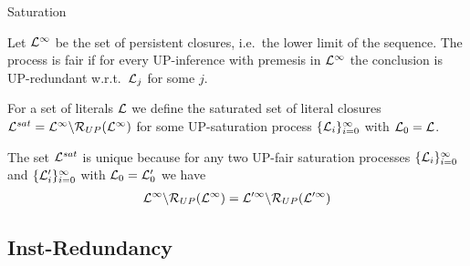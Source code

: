 \documentclass[%
]{beamer}
\begin{document}
\begin{frame}[allowframebreaks]{Saturation}
    \begin{definition}
        Let \( \mathcal{L}^\infty \) be the set of persistent closures,
        i.e.~the lower limit of the sequence.
        The process is { fair} if for every UP-inference
        with premesis in \( \mathcal{L}^\infty \) the conclusion is UP-redundant
        w.r.t.~\(\mathcal{L}_j\) for some \(j\).

        For a set of literals \( \mathcal{L} \) we define
        the saturated set of literal closures
        \( \mathcal{L}^{sat} = \mathcal{L}^\infty\backslash\mathcal{R}_{UP}(\mathcal{L}^\infty) \)
        for some UP-saturation process
        \( \{ \mathcal{L}_i\}_{i=0}^\infty \)
        with $\mathcal{L}_0 = \mathcal{L}$.
    \end{definition}

    \begin{lemma}
        The set \( \mathcal{L}^{sat} \) is unique because
        for any two UP-fair saturation processes
        \(\{ \mathcal{L}_i
            \}_{i=0}^\infty\) and
            \(\{ \mathcal{L}'_i
            \}_{i=0}^\infty\)
            with $\mathcal{L}_0 = \mathcal{L}'_0$ we have
            \begin{gather*}
                \mathcal{L}^\infty \backslash \mathcal{R}_{UP}(\mathcal{L}^\infty)
                =
                \mathcal{L}'^\infty \backslash \mathcal{R}_{UP}(\mathcal{L}'^\infty)
            \end{gather*}
    \end{lemma}
\end{frame}

\subsection{Inst-Redundancy}






\end{document}
